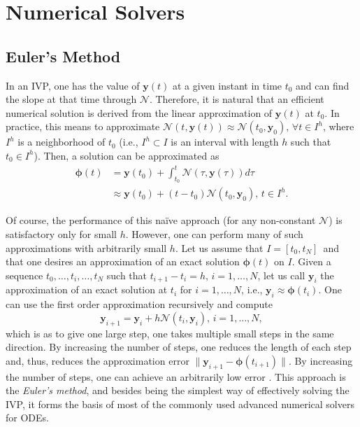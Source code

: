 \section{Numerical Solvers}

\subsection{Euler's Method}

In an \gls{IVP}, one has the value of $\bm{y}\left( t \right) $ at a given instant in time $t_0$ and can find the slope at that time through $\mathcal{N}$.
Therefore, it is natural that an efficient numerical solution is derived from the linear approximation of $\bm{y}\left( t \right) $ at $t_0$.
In practice, this means to approximate $\mathcal{N}\left( t, \bm{y}\left( t \right) \right) \approx \mathcal{N}\left( t_0, \bm{y}_0 \right),\,\forall t\in I^h $, where $I^h$ is a neighborhood of $t_0$ (i.e., $I^h \subset I$ is an interval with length $h$ such that $t_0\in I^h$).
Then, a solution can be approximated as
\begin{align*}
    \bm{\phi}\left( t \right) &= \bm{y}\left( t_0 \right) + \int_{t_0}^{t}\mathcal{N}\left( \tau, \bm{y}\left( \tau \right) \right)d\tau \\
    &\approx \bm{y}\left( t_0 \right) + \left( t-t_0 \right)\mathcal{N}\left( t_0, \bm{y}_0 \right),\,t\in I^h
.\end{align*}

Of course, the performance of this naïve approach (for any non-constant $\mathcal{N}$) is satisfactory only for small $h$.
However, one can perform many of such approximations with arbitrarily small $h$.
Let us assume that $I=\left[ t_0,t_N \right]$\footnotemark\, and that one desires an approximation of an exact solution $\bm{\phi}\left( t \right) $ on $I$.
Given a sequence $t_0,\ldots,t_i,\ldots,t_N$ such that $t_{i+1}-t_i=h,\,i=1,\ldots,N$, let us call $\bm{y}_{i}$ the approximation of an exact solution at $t_i$ for $i=1,\ldots,N$, i.e., $\bm{y}_{i}\approx \bm{\phi}(t_i)$.
One can use the first order approximation recursively and compute \[
\bm{y}_{i+1} = \bm{y}_{i} + h\mathcal{N}\left( t_i, \bm{y}_i \right),\,i=1,\ldots,N
,\] which is as to give one large step, one takes multiple small steps in the same direction.
By increasing the number of steps, one reduces the length of each step and, thus, reduces the approximation error $\|\bm{y}_{i+1}-\bm{\phi}(t_{i+1})\|$.
By increasing the number of steps, one can achieve an arbitrarily low error \cite{iserles_first_2008}.
This approach is the \emph{Euler's method}, and besides being the simplest way of effectively solving the \gls{IVP}, it forms the basis of most of the commonly used advanced numerical solvers for \gls{ODE}s.


